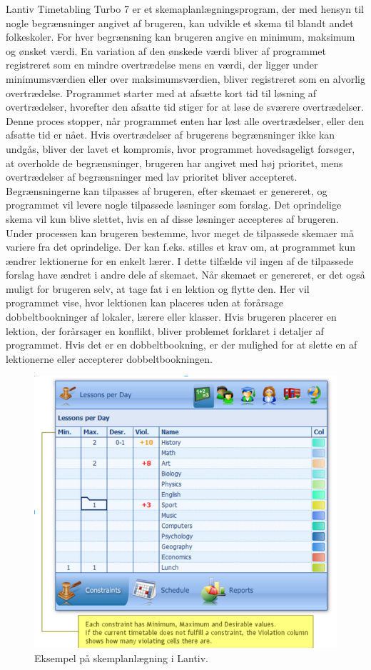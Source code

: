 Lantiv Timetabling Turbo 7 er et skemaplanlægningsprogram, der med hensyn til nogle begrænsninger angivet af brugeren, kan udvikle et skema til blandt andet folkeskoler. For hver begrænsning kan brugeren angive en minimum, maksimum og ønsket værdi. En variation af den ønskede værdi bliver af programmet registreret som en mindre overtrædelse mens en værdi, der ligger under minimumsværdien eller over maksimumsværdien, bliver registreret som en alvorlig overtrædelse. Programmet starter med at afsætte kort tid til løsning af overtrædelser, hvorefter den afsatte tid stiger for at løse de sværere overtrædelser. Denne proces stopper, når programmet enten har løst alle overtrædelser, eller den afsatte tid er nået. Hvis overtrædelser af brugerens begrænsninger ikke kan undgås, bliver der lavet et kompromis, hvor programmet hovedsageligt forsøger, at overholde de begrænsninger, brugeren har angivet med høj prioritet, mens overtrædelser af begrænsninger med lav prioritet bliver accepteret. Begrænsningerne kan tilpasses af brugeren, efter skemaet er genereret, og programmet vil levere nogle tilpassede løsninger som forslag. Det oprindelige skema vil kun blive slettet, hvis en af disse løsninger accepteres af brugeren. Under processen kan brugeren bestemme, hvor meget de tilpassede skemaer må variere fra det oprindelige. Der kan f.eks. stilles et krav om, at programmet kun ændrer lektionerne for en enkelt lærer. I dette tilfælde vil ingen af de tilpassede forslag have ændret i andre dele af skemaet. Når skemaet er genereret, er det også muligt for brugeren selv, at tage fat i en lektion og flytte den. Her vil programmet vise, hvor lektionen kan placeres uden at forårsage dobbeltbookninger af lokaler, lærere eller klasser. Hvis brugeren placerer en lektion, der forårsager en konflikt, bliver problemet forklaret i detaljer af programmet. Hvis det er en dobbeltbookning, er der mulighed for at slette en af lektionerne eller accepterer dobbeltbookningen.
\begin{figure}[!h]
  \centering
  \includegraphics[scale = 0.8]{partials/graphics/LANTIV.png}
    \caption{Eksempel på skemplanlægning i Lantiv.}
  \label{fig:lantiv}
\end{figure}